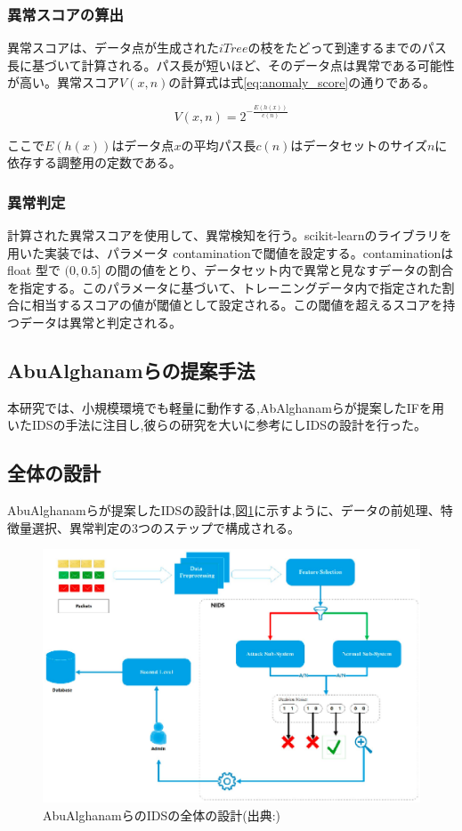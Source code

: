 \documentclass{css}
\begin{document}
\subsubsection{異常スコアの算出}

異常スコアは、データ点が生成された$iTree$の枝をたどって到達するまでのパス長に基づいて計算される。パス長が短いほど、そのデータ点は異常である可能性が高い。異常スコア$V(x,n)$の計算式は式\ref{eq:anomaly_score}の通りである。


\begin{equation}
    V(x, n) = 2^{-\frac{E(h(x))}{c(n)}}
    \label{eq:anomaly_score}
\end{equation}

ここで$E(h(x))$はデータ点$x$の平均パス長$c(n)$はデータセットのサイズ$n$に依存する調整用の定数である。

\subsubsection{異常判定}
計算された異常スコアを使用して、異常検知を行う。scikit-learnのライブラリを用いた実装では、パラメータ contaminationで閾値を設定する。contaminationは float 型で $(0, 0.5]$ の間の値をとり、データセット内で異常と見なすデータの割合を指定する。このパラメータに基づいて、トレーニングデータ内で指定された割合に相当するスコアの値が閾値として設定される。この閾値を超えるスコアを持つデータは異常と判定される。


\subsection{AbuAlghanamらの提案手法}
本研究では、小規模環境でも軽量に動作する,AbAlghanamらが提案したIFを用いたIDSの手法\cite{AbuAlghanam2023-sx}に注目し,彼らの研究を大いに参考にしIDSの設計を行った。

\subsection{全体の設計}
AbuAlghanamらが提案したIDSの設計\cite{AbuAlghanam2023-sx}は,図\ref{fig:IDS}に示すように、データの前処理、特徴量選択、異常判定の3つのステップで構成される。

\begin{figure}[ht]
    \centering
    \includegraphics[width=0.9\linewidth]{pictures/eps/system.eps}
    \caption{AbuAlghanamらのIDSの全体の設計(出典:\cite{AbuAlghanam2023-sx})}
    \label{fig:IDS}
\end{figure}
\end{document}
